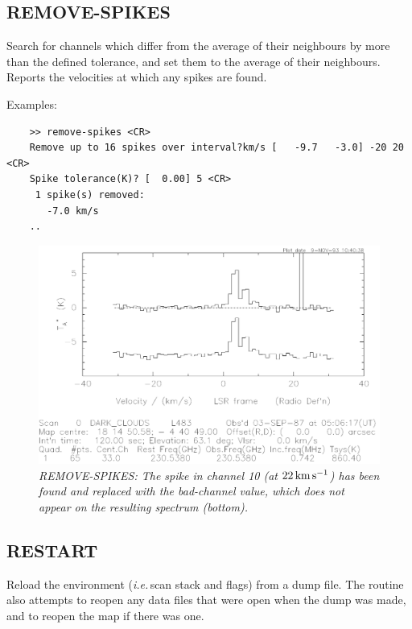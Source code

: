 \documentclass[11pt,twoside]{report}
\newcommand{\ie}{{\it i.e.\,}}
\newcommand{\kms}{{\rm\,km\,s^{-1}}}
\begin{document}
\subsection{REMOVE-SPIKES} 

Search for channels which differ from the average of their neighbours by
more than the defined tolerance, and set them to the average of their
neighbours. Reports the velocities at which any spikes are found.

Examples:
\begin{verbatim}
    >> remove-spikes <CR>
    Remove up to 16 spikes over interval?km/s [   -9.7   -3.0] -20 20 <CR>
    Spike tolerance(K)? [  0.00] 5 <CR>
     1 spike(s) removed:
       -7.0 km/s
    ..
\end{verbatim}

\begin{figure}[htbp]
\begin{center}
\includegraphics[scale=0.65]{rem-spikes}
\protect\parbox{5.5in}
{\caption[SPIKES]
{\sl
REMOVE-SPIKES: The spike in channel 10 (at $22\kms$) has been found and
replaced with the bad-channel value, which does not appear on the
resulting spectrum (bottom).
\label{SPIKES}
}
}
\end{center}
\end{figure}

\subsection{RESTART} 

Reload the environment  (\ie scan stack
and flags) from a dump file. The routine also attempts to reopen any data files
that were open when the dump was made, and to reopen the map if there was one.
\end{document}
